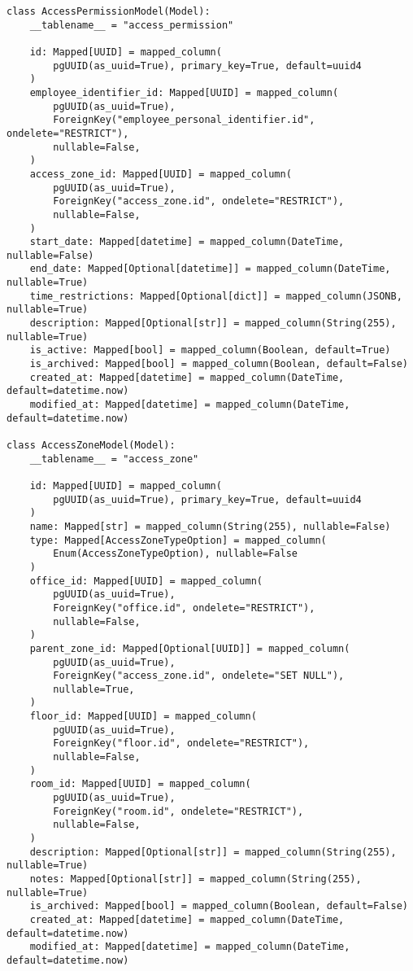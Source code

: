 \begin{lstlisting}[style=pythonstyle]
class AccessPermissionModel(Model):
    __tablename__ = "access_permission"

    id: Mapped[UUID] = mapped_column(
        pgUUID(as_uuid=True), primary_key=True, default=uuid4
    )
    employee_identifier_id: Mapped[UUID] = mapped_column(
        pgUUID(as_uuid=True),
        ForeignKey("employee_personal_identifier.id", ondelete="RESTRICT"),
        nullable=False,
    )
    access_zone_id: Mapped[UUID] = mapped_column(
        pgUUID(as_uuid=True),
        ForeignKey("access_zone.id", ondelete="RESTRICT"),
        nullable=False,
    )
    start_date: Mapped[datetime] = mapped_column(DateTime, nullable=False)
    end_date: Mapped[Optional[datetime]] = mapped_column(DateTime, nullable=True)
    time_restrictions: Mapped[Optional[dict]] = mapped_column(JSONB, nullable=True)
    description: Mapped[Optional[str]] = mapped_column(String(255), nullable=True)
    is_active: Mapped[bool] = mapped_column(Boolean, default=True)
    is_archived: Mapped[bool] = mapped_column(Boolean, default=False)
    created_at: Mapped[datetime] = mapped_column(DateTime, default=datetime.now)
    modified_at: Mapped[datetime] = mapped_column(DateTime, default=datetime.now)

class AccessZoneModel(Model):
    __tablename__ = "access_zone"

    id: Mapped[UUID] = mapped_column(
        pgUUID(as_uuid=True), primary_key=True, default=uuid4
    )
    name: Mapped[str] = mapped_column(String(255), nullable=False)
    type: Mapped[AccessZoneTypeOption] = mapped_column(
        Enum(AccessZoneTypeOption), nullable=False
    )
    office_id: Mapped[UUID] = mapped_column(
        pgUUID(as_uuid=True),
        ForeignKey("office.id", ondelete="RESTRICT"),
        nullable=False,
    )
    parent_zone_id: Mapped[Optional[UUID]] = mapped_column(
        pgUUID(as_uuid=True),
        ForeignKey("access_zone.id", ondelete="SET NULL"),
        nullable=True,
    )
    floor_id: Mapped[UUID] = mapped_column(
        pgUUID(as_uuid=True),
        ForeignKey("floor.id", ondelete="RESTRICT"),
        nullable=False,
    )
    room_id: Mapped[UUID] = mapped_column(
        pgUUID(as_uuid=True),
        ForeignKey("room.id", ondelete="RESTRICT"),
        nullable=False,
    )
    description: Mapped[Optional[str]] = mapped_column(String(255), nullable=True)
    notes: Mapped[Optional[str]] = mapped_column(String(255), nullable=True)
    is_archived: Mapped[bool] = mapped_column(Boolean, default=False)
    created_at: Mapped[datetime] = mapped_column(DateTime, default=datetime.now)
    modified_at: Mapped[datetime] = mapped_column(DateTime, default=datetime.now)


\end{lstlisting}
